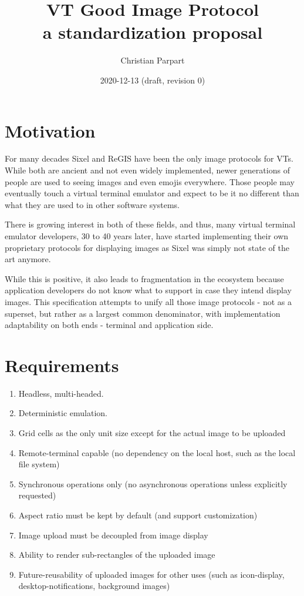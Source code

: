 \documentclass{article}
\title{VT Good Image Protocol \\
a standardization proposal}
\author{Christian Parpart}
\date{2020-12-13 (draft, revision 0)}
\begin{document}
\maketitle

\tableofcontents


\section{Motivation} %

For many decades Sixel and ReGIS have been the only image protocols for VTs. While both are
ancient and not even widely implemented, newer generations of people are used to seeing images
and even emojis everywhere. Those people may eventually touch a virtual terminal emulator
and expect to be it no different than what they are used to in other software systems.

There is growing interest in both of these fields, and thus, many virtual terminal emulator
developers, 30 to 40 years later, have started implementing their own proprietary protocols
for displaying images as Sixel was simply not state of the art anymore.

While this is positive, it also leads to fragmentation in the ecosystem because application
developers do not know what to support in case they intend display images.
This specification attempts to unify all those image protocols - not as a superset, but rather
as a largest common denominator, with implementation adaptability on both ends - terminal and
application side.

\section{Requirements} %

\begin{enumerate}
    \item Headless, multi-headed.
    \item Deterministic emulation.
    \item Grid cells as the only unit size except for the actual image to be uploaded
    \item Remote-terminal capable (no dependency on the local host, such as the local file system)
    \item Synchronous operations only (no asynchronous operations unless explicitly requested)
    \item Aspect ratio must be kept by default (and support customization)
    \item Image upload must be decoupled from image display
    \item Ability to render sub-rectangles of the uploaded image
    \item Future-reusability of uploaded images for other uses (such as
        icon-display, desktop-notifications, background images)
\end{enumerate}
\end{document}
